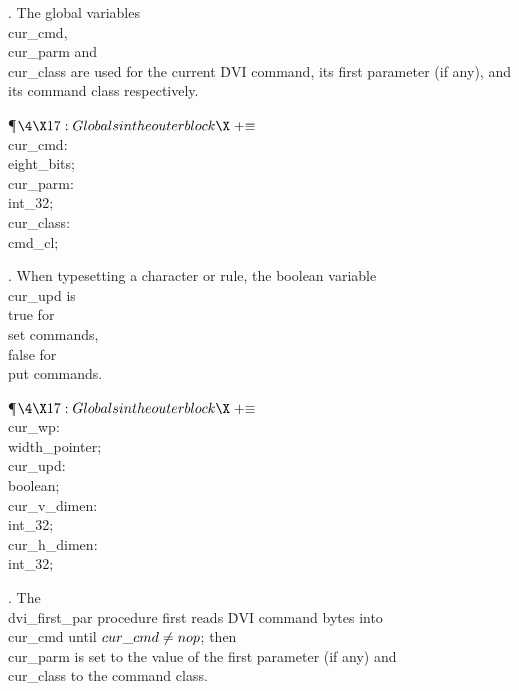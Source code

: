 . The global variables \\{cur\_cmd}, \\{cur\_parm} and \\{cur\_class} are
used
for the current \.{DVI} command, its first parameter (if any), and its
command class respectively.

\Y\P$\4\X17:Globals in the outer block\X\mathrel{+}\S$\6
\4\\{cur\_cmd}: \\{eight\_bits};\6
\4\\{cur\_parm}: \\{int\_32};\6
\4\\{cur\_class}: \\{cmd\_cl};\par
\fi

. When typesetting a character or rule, the boolean variable \\{cur\_upd}
is \\{true} for \\{set} commands, \\{false} for \\{put} commands.

\Y\P$\4\X17:Globals in the outer block\X\mathrel{+}\S$\6
\4\\{cur\_wp}: \\{width\_pointer};%
\6
\4\\{cur\_upd}: \\{boolean};%
\6
\4\\{cur\_v\_dimen}: \\{int\_32};\6
\4\\{cur\_h\_dimen}: \\{int\_32};\par
\fi

. The \\{dvi\_first\_par} procedure first reads \.{DVI} command bytes into
\\{cur\_cmd} until $\\{cur\_cmd}\ne\\{nop}$; then \\{cur\_parm} is set to the
value of
the first parameter (if any) and \\{cur\_class} to the command class.


